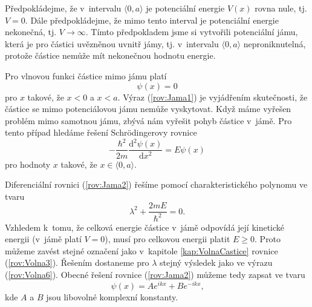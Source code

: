 Předpokládejme, že v~intervalu $\langle0,a\rangle$ je potenciální energie $V(x)$ rovna nule, tj. $V = 0$. Dále předpokládejme, že mimo tento interval je potenciální energie nekonečná, tj. $V \rightarrow \infty$. Tímto předpokladem jsme si vytvořili potenciální jámu, která je pro částici uvězněnou uvnitř jámy, tj. v~intervalu $\langle0,a\rangle$ neproniknutelná, protože částice nemůže mít nekonečnou hodnotu energie.

Pro vlnovou funkci částice mimo jámu platí
\begin{equation}
\psi(x) = 0
\label{rov:Jama1}
\end{equation}
pro $x$ takové, že $x < 0$ a $x< a$. Výraz (\ref{rov:Jama1}) je vyjádřením skutečnosti, že částice se mimo potenciálovou jámu nemůže vyskytovat. Když máme vyřešen problém mimo samotnou jámu, zbývá nám vyřešit pohyb částice v~jámě. Pro tento případ hledáme řešení Schrödingerovy rovnice
\begin{equation}
-\frac{\hbar^2}{2m} \frac{\mathrm{d}^2\psi(x)}{\mathrm{d}x^2} = E \psi(x)
\label{rov:Jama2}
\end{equation}
pro hodnoty $x$ takové, že $x\in\langle 0,a\rangle $.

Diferenciální rovnici (\ref{rov:Jama2}) řešíme pomocí charakteristického polynomu ve tvaru
\begin{equation}
\lambda^2 + \frac{2mE}{\hbar^2} = 0 \mbox{.}
\label{rov:Jama3}
\end{equation}
Vzhledem k~tomu, že celková energie částice v~jámě odpovídá její kinetické energii (v~jámě platí $V = 0$), musí pro celkovou energii platit $E\geq0$. Proto můžeme zavést stejné označení jako v~kapitole \ref{kap:VolnaCastice} rovnice (\ref{rov:Volna3}). Řešením dostaneme pro $\lambda$ stejný výsledek jako ve výrazu (\ref{rov:Volna6}). Obecné řešení rovnice (\ref{rov:Jama2}) můžeme tedy zapsat ve tvaru
\begin{equation}
\psi(x) = Ae^{ikx} + Be^{-ikx} \mbox{,}
\label{rov:Jama4}
\end{equation}
kde $A$ a $B$ jsou libovolné komplexní konstanty.


